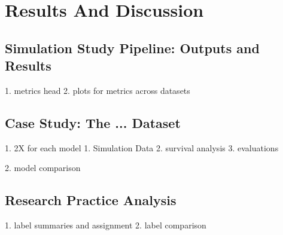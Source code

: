 \chapter{Results And Discussion}
\label{Chapter4}


\section{Simulation Study Pipeline: Outputs and Results}

1. metrics head
2. plots for metrics across datasets



\section{Case Study: The ... Dataset}

1. 2X for each model
{
    1. Simulation Data
    2. survival analysis
    3. evaluations
}

2. model comparison 

\section{Research Practice Analysis}

1. label summaries and assignment
2. label comparison


